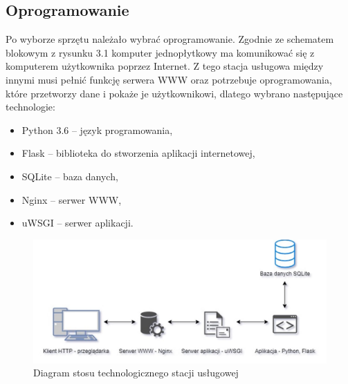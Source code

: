 \documentclass[12pt, twoside, openany]{mwrep}
\begin{document}
\subsection{Oprogramowanie}
Po wyborze sprzętu należało wybrać oprogramowanie. Zgodnie ze schematem blokowym z rysunku 3.1 komputer jednopłytkowy ma komunikować się z komputerem użytkownika poprzez Internet.  Z tego stacja usługowa między innymi musi pełnić funkcję serwera WWW oraz potrzebuje oprogramowania, które przetworzy dane i pokaże je użytkownikowi, dlatego wybrano następujące technologie:

\begin{itemize}
\item Python 3.6 – język programowania,
\item Flask – biblioteka do stworzenia aplikacji internetowej,
\item SQLite – baza danych,
\item Nginx – serwer WWW, 
\item uWSGI – serwer aplikacji.
\end{itemize}

\begin{figure}[H]
\centering
\includegraphics[width=\textwidth]{stos}
\caption{Diagram stosu technologicznego stacji usługowej }
\end{figure}
\end{document}
